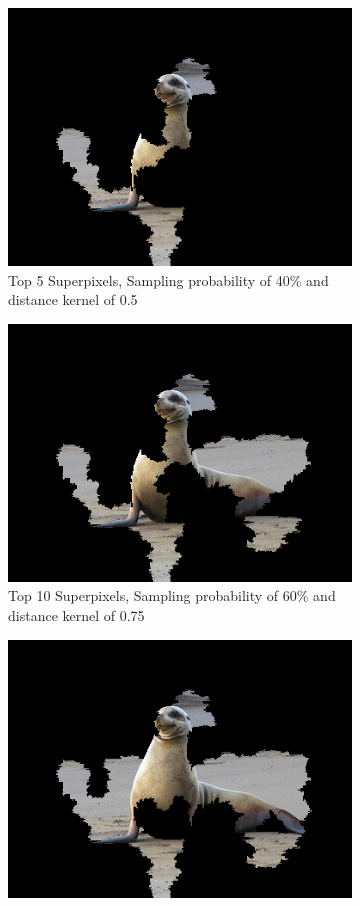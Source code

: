 \begin{figure}
    \captionsetup{justification=centering}

    \begin{subfigure}[t]{0.32\textwidth}
        \captionsetup{justification=centering}
        \centering
        \includegraphics[width=.7\linewidth]{figuras/lime/experiments/sea_lion/lime_sea_lion_sp0.4_dk0.5_nc5.png}
        \caption{Top 5 Superpixels, Sampling probability of 40\% and distance kernel of 0.5}
    \end{subfigure}
    \hfill
    \begin{subfigure}[t]{0.32\textwidth}
        \captionsetup{justification=centering}
        \centering
        \includegraphics[width=.7\linewidth]{figuras/lime/experiments/sea_lion/lime_sea_lion_sp0.7_dk0.5_nc10.png}
        \caption{Top 10 Superpixels, Sampling probability of 60\% and distance kernel of 0.75}
    \end{subfigure}
    \hfill
    \begin{subfigure}[t]{0.32\textwidth}
        \captionsetup{justification=centering}
        \centering
        \includegraphics[width=.7\linewidth]{figuras/lime/experiments/sea_lion/lime_sea_lion_sp0.8_dk1_nc15.png}

\end{subfigure}
\end{figure}
